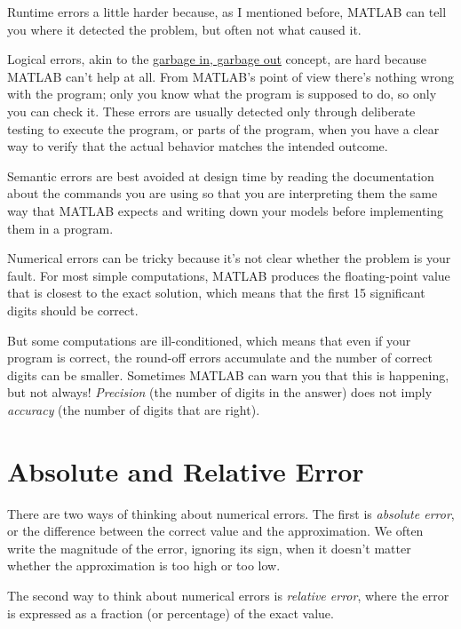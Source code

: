 Runtime errors a little harder because, as I mentioned before, MATLAB can tell you where it detected the problem, but often not what caused it.

Logical errors, akin to the \href{https://en.wikipedia.org/wiki/Garbage_in,_garbage_out}{garbage in, garbage out} concept, are hard because MATLAB can't help at all. From MATLAB's point of view there's nothing wrong with the program; only you know what the program is supposed to do, so only you can check it.  These errors are usually detected only through deliberate testing to execute the program, or parts of the program, when you have a clear way to verify that the actual behavior matches the intended outcome.

Semantic errors are best avoided at design time by reading the documentation about the commands you are using so that you are interpreting them the same way that MATLAB expects and writing down your models before implementing them in a program.

Numerical errors can be tricky because it's not clear whether the problem is your fault.  For most simple computations, MATLAB produces the floating-point value that is closest to the exact solution, which means that the first 15 significant digits should be correct.

But some computations are ill-conditioned, which means that even if your program is correct, the round-off errors accumulate and the number of correct digits can be smaller.  Sometimes MATLAB can warn you that this is happening, but not always!  \emph{Precision} (the number of digits in the answer) does not imply \emph{accuracy} (the number of digits that are right).


\section{Absolute and Relative Error}

There are two ways of thinking about numerical errors.
The first is \emph{absolute error}, or the difference between the correct value and the approximation.  We often write the magnitude of the error,
ignoring its sign, when it doesn't matter whether the approximation
is too high or too low.
 

The second way to think about numerical errors is \emph{relative error}, where the error is expressed as a fraction (or percentage) of the exact value.

